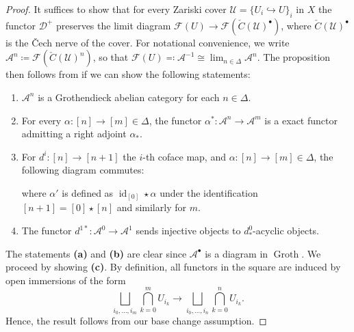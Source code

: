 \documentclass{article}
\theoremstyle{definition}
\theoremstyle{definition}
\theoremstyle{definition}
\theoremstyle{plain}
\theoremstyle{plain}
\theoremstyle{plain}
\theoremstyle{plain}
\theoremstyle{plain}
\theoremstyle{plain}
\theoremstyle{plain}
\theoremstyle{plain}
\theoremstyle{remark}
\theoremstyle{remark}
\theoremstyle{plain}
\theoremstyle{plain}
\theoremstyle{plain}
\theoremstyle{plain}
\theoremstyle{plain}
\newcommand{\id}[1]{\operatorname{id}_{#1}}
\renewcommand{\lim}{\operatorname{lim}}
\newcommand{\Cat}[1]{\mathcal{#1}}
\newcommand{\Groth}{\operatorname{Groth}}
\begin{document}
\begin{proof}
    It suffices to show that for every Zariski cover $\Cat U = \{U_i \hookrightarrow U\}_i$ in $X$ the functor 
    $\Cat D^+$ preserves the limit diagram $\Cat F(U) \to \Cat F(\check{C}(\Cat U)^\bullet)$,
    where $\check{C}(\Cat U)^\bullet$ is the \v{C}ech nerve of the cover.
    For notational convenience, we write $\Cat A^n \coloneqq \Cat F(\check{C}(\Cat U)^n)$,
    so that $\Cat F(U) \eqqcolon \Cat A^{-1} \cong \lim_{n \in \Delta} \Cat A^n$.
    The proposition then follows from \cite[Proposition A.4.23]{heyer20246} if we can show the following statements:
    \begin{enumerate}[label=\textbf{(\alph*)}]
        \item $\Cat A^n$ is a Grothendieck abelian category for each $n \in \Delta$.
        \item For every $\alpha \colon [n] \to [m] \in \Delta$,
            the functor $\alpha^* \colon \Cat A^n \to \Cat A^m$ is a exact functor admitting a right adjoint $\alpha_*$.
        \item For $d^i \colon [n] \to [n+1]$ the $i$-th coface map, and $\alpha \colon [n] \to [m] \in \Delta$,
            the following diagram commutes:
            \begin{center}
            \end{center}
            where $\alpha'$ is defined as $\id{[0]} \star\alpha$ under the identification $[n+1]=[0]\star[n]$ and similarly for $m$.
        \item The functor $d^{1*} \colon \Cat A^0 \to \Cat A^1$ sends injective objects to $d^0_*$-acyclic objects.
    \end{enumerate}
    The statements \textbf{(a)} and \textbf{(b)} are clear since $\Cat A^\bullet$ is a diagram in $\Groth$.
    We proceed by showing \textbf{(c)}. By definition, all functors in the square are induced by open immersions of the form
    \begin{equation*}
        \bigsqcup_{i_0, \dots, i_m} \bigcap_{k = 0}^{m} U_{i_k} \to \bigsqcup_{i_0, \dots, i_n} \bigcap_{k = 0}^{n} U_{i_k}.
    \end{equation*}
    Hence, the result follows from our base change assumption.


\end{proof}
\end{document}
